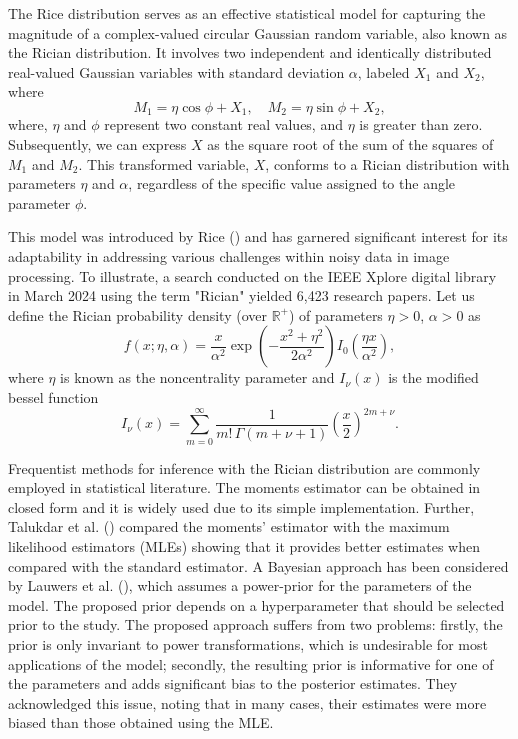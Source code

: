 \documentclass[12pt]{interact}
\theoremstyle{plain}%
\theoremstyle{definition}
\theoremstyle{remark}
\begin{document}
The Rice distribution serves as an effective statistical model for capturing the magnitude of a complex-valued circular Gaussian random variable, also known as the Rician distribution. It involves two independent and identically distributed real-valued Gaussian variables with standard deviation $\alpha$, labeled $X_1$ and $X_2$, where
\begin{equation*}
M_1 = \eta \cos \phi + X_1, \quad
M_2 = \eta \sin \phi + X_2,
\end{equation*}
where, $\eta$ and $\phi$ represent two constant real values, and $\eta$ is greater than zero. Subsequently, we can express $X$ as the square root of the sum of the squares of $M_1$ and $M_2$. This transformed variable, $X$, conforms to a Rician distribution with parameters $\eta$ and $\alpha$, regardless of the specific value assigned to the angle parameter $\phi$.

This model was introduced by Rice (\cite{rice1945mathematical}) and has garnered significant interest for its adaptability in addressing various challenges within noisy data in image processing. To illustrate, a search conducted on the IEEE Xplore digital library in March 2024 using the term "Rician" yielded 6,423 research papers. Let us define the Rician probability density (over $\mathbb{R}^+$) of parameters $\eta > 0$, $\alpha > 0$ as
\begin{equation}\label{dens}
f(x ; \eta, \alpha) =
\frac{x}{\alpha^2} \exp\left( -\frac{x^2 + \eta^2}{2\alpha^2} \right) I_0\left( \frac{\eta x}{\alpha^2} \right),
\end{equation}
where $\eta$ is known as the noncentrality parameter and $I_{\nu }(x)$ is the modified bessel function
 \begin{equation}
I_{\nu }(x)=\sum _{m=0}^{\infty }{\frac {1}{m!\,\Gamma (m+\nu +1)}}\left({\frac {x}{2}}\right)^{2m+\nu } .
\end{equation}

Frequentist methods for inference with the Rician distribution are commonly employed in statistical literature. The moments estimator can be obtained in closed form and it is widely used due to its simple implementation. Further, Talukdar et al. (\cite{talukdar1991estimation}) compared the moments' estimator with the maximum likelihood estimators (MLEs) showing that it provides better estimates when compared with the standard estimator. A Bayesian approach has been considered by Lauwers et al. (\cite{lauwers2009estimating}), which assumes a power-prior for the parameters of the model. The proposed prior depends on a hyperparameter that should be selected prior to the study. The proposed approach suffers from two problems: firstly, the prior is only invariant to power transformations, which is undesirable for most applications of the model; secondly, the resulting prior is informative for one of the parameters and adds significant bias to the posterior estimates. They acknowledged this issue, noting that in many cases, their estimates were more biased than those obtained using the MLE.
\end{document}
